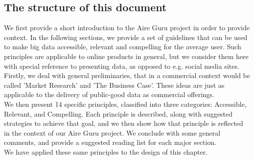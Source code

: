 \subsection{The structure of this document}

We first provide a short introduction to the Aire Guru project in order to provide context.
In the following sections, we provide a set of guidelines that can be used to make big data
accessible, relevant and compelling for the average user. Such principles are applicable to 
online products in general, but we consider them here with special reference to presenting
data, as opposed to e.g. social media sites. \\

Firstly, we deal with general preliminaries, that in a commercial context would be called
'Market Research' and 'The Business Case'. These ideas are just as applicable to the delivery of
public-good data as commercial offerings. \\

We then present 14 specific principles, classified into three categories: Accessible, Relevant, and Compelling.
Each principle is described, along with suggested strategies to achieve that goal, and we then show
how that principle is reflected in the context of our Aire Guru project. We conclude with some
general comments, and provide a suggested reading list for each major section. \\

We have applied these same principles to the design of this chapter.
